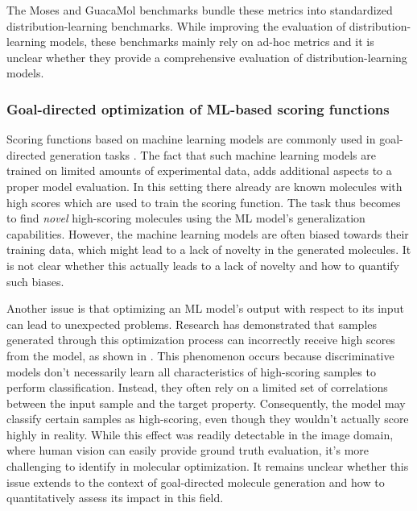 The Moses \citep{polykovskiyMolecularSetsMOSES2020} and GuacaMol
\citep{brownGuacaMolBenchmarkingModels2019} benchmarks bundle these metrics into standardized
distribution-learning benchmarks. While improving the evaluation of distribution-learning
models, these benchmarks mainly rely on ad-hoc metrics and it is unclear
whether they provide a comprehensive evaluation of distribution-learning models.

\subsubsection{Goal-directed optimization of ML-based scoring functions}
Scoring functions based on machine learning models are commonly used in goal-directed generation
tasks \citep{todo}. The fact that such machine learning models are trained on limited amounts of
experimental data, adds additional aspects to a proper model evaluation. In this setting there
already are known molecules with high scores which are  used to train the scoring function. The task
thus becomes to find \emph{novel} high-scoring molecules using the ML model's generalization
capabilities. However, the machine learning models are often biased towards their training data,
which might lead to a lack of novelty in the generated molecules. It is not clear whether
this actually leads to a lack of novelty and how to quantify such biases.

Another issue is that optimizing an ML model's output with respect to its input can lead to
unexpected problems. Research has demonstrated that samples generated through this optimization
process can incorrectly receive high scores from the model, as shown in
\citep{szegedyIntriguingPropertiesNeural2014,goodfellowExplainingHarnessingAdversarial2015}. This
phenomenon occurs because discriminative models don't necessarily learn all characteristics of
high-scoring samples to perform classification. Instead, they often rely on a limited set of
correlations between the input sample and the target property. Consequently, the model may classify
certain samples as high-scoring, even though they wouldn't actually score highly in reality. While
this effect was readily detectable in the image domain, where human vision can easily provide ground
truth evaluation, it's more challenging to identify in molecular optimization. It remains unclear
whether this issue extends to the context of goal-directed molecule generation and how to
quantitatively assess its impact in this field.


